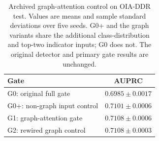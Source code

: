 \begin{table}[htbp]
\centering
\caption{Archived graph-attention control on OIA-DDR test. Values are means and sample standard deviations over five seeds. G0+ and the graph variants share the additional class-distribution and top-two indicator inputs; G0 does not. The original detector and primary gate results are unchanged.}
\label{tab:native_gate_control}
\footnotesize
\setlength{\tabcolsep}{3pt}
\begin{tabular}{lc}
\toprule
Gate & AUPRC \\
\midrule
G0: original full gate & $0.6985\pm0.0017$ \\
G0+: non-graph input control & $0.7101\pm0.0006$ \\
G1: graph-attention gate & $0.7108\pm0.0006$ \\
G2: rewired graph control & $0.7108\pm0.0003$ \\
\bottomrule
\end{tabular}
\par{}
\end{table}
